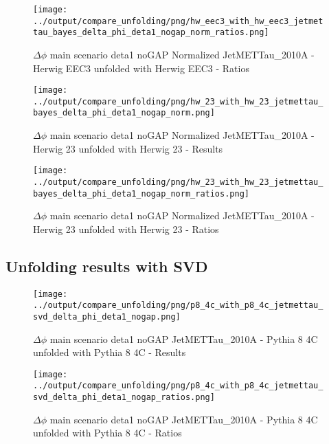 \documentclass[11pt]{book}
\begin{document}
\begin{figure}[ht]
\centering
\texttt{[image: ../output/compare\_unfolding/png/hw\_eec3\_with\_hw\_eec3\_jetmettau\_bayes\_delta\_phi\_deta1\_nogap\_norm\_ratios.png]}
\caption{$\Delta\phi$ main scenario deta1 noGAP Normalized JetMETTau\_2010A - Herwig EEC3 unfolded with Herwig EEC3 - Ratios}
\label{hw_eec3_hw_eec3_jetmettau_bayes_delta_phi_deta1_nogap_norm_b}
\end{figure}

\begin{figure}[ht]
\centering
\texttt{[image: ../output/compare\_unfolding/png/hw\_23\_with\_hw\_23\_jetmettau\_bayes\_delta\_phi\_deta1\_nogap\_norm.png]}
\caption{$\Delta\phi$ main scenario deta1 noGAP Normalized JetMETTau\_2010A - Herwig 23 unfolded with Herwig 23 - Results}
\label{hw_23_hw_23_jetmettau_bayes_delta_phi_deta1_nogap_norm_a}
\end{figure}

\begin{figure}[ht]
\centering
\texttt{[image: ../output/compare\_unfolding/png/hw\_23\_with\_hw\_23\_jetmettau\_bayes\_delta\_phi\_deta1\_nogap\_norm\_ratios.png]}
\caption{$\Delta\phi$ main scenario deta1 noGAP Normalized JetMETTau\_2010A - Herwig 23 unfolded with Herwig 23 - Ratios}
\label{hw_23_hw_23_jetmettau_bayes_delta_phi_deta1_nogap_norm_b}
\end{figure}


\clearpage
\subsection{Unfolding results with SVD}

\begin{figure}[ht]
\centering
\texttt{[image: ../output/compare\_unfolding/png/p8\_4c\_with\_p8\_4c\_jetmettau\_svd\_delta\_phi\_deta1\_nogap.png]}
\caption{$\Delta\phi$ main scenario deta1 noGAP JetMETTau\_2010A - Pythia 8 4C unfolded with Pythia 8 4C - Results}
\label{p8_p8_jetmettau_svd_delta_phi_deta1_nogap_a}
\end{figure}

\begin{figure}[ht]
\centering
\texttt{[image: ../output/compare\_unfolding/png/p8\_4c\_with\_p8\_4c\_jetmettau\_svd\_delta\_phi\_deta1\_nogap\_ratios.png]}
\caption{$\Delta\phi$ main scenario deta1 noGAP JetMETTau\_2010A - Pythia 8 4C unfolded with Pythia 8 4C - Ratios}
\label{p8_p8_jetmettau_svd_delta_phi_deta1_nogap_b}
\end{figure}
\end{document}
